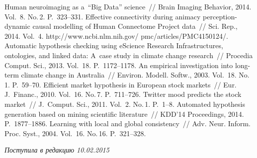 \begin{multicols}{2}
{{\begin{thebibliography}{99}
 Human neuroimaging as a~``Big Data''
science~// Brain Imaging Behavior, 2014.  Vol.~8. No.\,2.  P.~323--331.
 Effective connectivity during
animacy perception-dynamic causal modelling of Human Connectome Project data~//
Sci. Rep., 2014.  Vol.~4. {\sf
http://www.ncbi.nlm.nih.gov/ pmc/articles/PMC4150124/}.
 Automatic hypothesis checking using eScience
Research Infrastructures, ontologies, and linked data: A~case study in climate change
research~// Procedia Comput. Sci., 2013. Vol.~18. P.~1172--1178.
 An empirical investigation into long-term climate
change in Australia~// Environ. Modell. Softw., 2003. Vol.~18. No.\,1.
P.~59--70.
 Efficient market hypothesis in European stock markets~//
Eur. J.~Financ., 2010. Vol.~16. No.\,7. P.~711--726.
 Twitter mood predicts the stock market~//
J.~Comput. Sci., 2011. Vol.~2. No.\,1. P.~1--8.
 Automated
hypothesis generation based on mining scientific literature~// KDD'14 Proceedings,
2014. P.~1877--1886.
Learning with local and global consistency~// Adv. Neur. Inform.
Proc. Syst., 2004.  Vol.~16. No.\,16. P.~321--328.

\end{thebibliography}
} }

\end{multicols}

 \label{end\stat}

 \vspace*{-3pt}

\hfill{\small\textit{Поступила в редакцию 10.02.2015}}
\renewcommand{\bibname}{\protect\rm Литература}
\renewcommand{\figurename}{\protect\bf Рис.}
